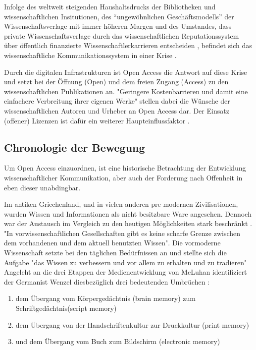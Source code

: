 Infolge des weltweit steigenden Haushaltsdrucks der Bibliotheken und wissenschaftlichen Insitutionen, des “ungewöhnlichen Geschäftsmodells” \cite{cite:12} der Wissenschaftsverlage mit immer höheren Margen \cite{albert_2006_open_implications} und des Umstandes, dass private Wissenschaftsverlage durch das wissenschaftlichen Reputationssystem über öffentlich finanzierte Wissenschaftlerkarrieren entscheiden \cite{heise_2012}, befindet sich das wissenschaftliche Kommunikationssystem in einer Krise \cite{cite:14}. 

Durch die digitalen Infrastrukturen ist Open Access die Antwort auf diese Krise und setzt bei der Öffnung (Open) und dem freien Zugang (Access) zu den wissenschaftlichen Publikationen an. "Geringere Kostenbarrieren und damit eine einfachere Verbreitung ihrer eigenen Werke" \cite{WD_bundestag_2009} stellen dabei die Wünsche der wissenschaftlichen Autoren und Urheber an Open Access dar. Der Einsatz (offener) Lizenzen ist dafür ein weiterer Haupteinflussfaktor \cite{cite:16}. 

\subsection{Chronologie der Bewegung}
Um Open Access einzuordnen, ist eine historische Betrachtung der Entwicklung wissenschaftlicher Kommunikation, aber auch der Forderung nach Offenheit in eben dieser unabdingbar. 

Im antiken Griechenland, und in vielen anderen pre-modernen Zivilisationen, wurden Wissen und Informationen als nicht besitzbare Ware angesehen\cite{cite:18}. Dennoch war der Austausch im Vergleich zu den heutigen Möglichkeiten stark beschränkt \cite{cite:17c}. "In vorwissenschaftlichen Gesellschaften gibt es keine scharfe Grenze zwischen dem vorhandenen und dem aktuell benutzten Wissen"\cite{Luhmann1998}. Die vormoderne Wissenschaft setzte bei den täglichen Bedürfnissen an und stellte sich die Aufgabe "das Wissen zu verbessern und vor allem zu erhalten und zu tradieren" \cite{Luhmann1998} Angeleht an die drei Etappen der Medienentwicklung von McLuhan \cite{wunderlich_2008_buchdruck} identifiziert der Germanist Wenzel diesbezüglich drei bedeutenden Umbrüchen \cite{wenzel_mediengeschichte_2007}: 
\begin{enumerate}
\item dem Übergang vom Körpergedächtnis (brain memory) zum Schriftgedächtnis(script memory)
\item dem Übergang von der Handschriftenkultur zur Druckkultur (print memory)
\item und dem Übergang vom Buch zum Bildschirm (electronic memory)
\end{enumerate}


